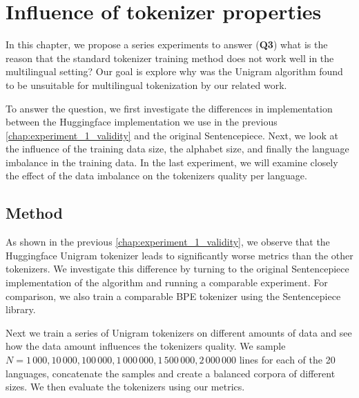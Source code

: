 \chapter{Influence of tokenizer properties}
\label{chap:experiment_2_properties}


In this chapter, we propose a series experiments to answer (\textbf{Q3}) what is the reason that the standard tokenizer training method does not work well in the multilingual setting? Our goal is explore why was the Unigram algorithm found to be unsuitable for multilingual tokenization by our related work.

To answer the question, we first investigate the differences in implementation between the Huggingface implementation we use in the previous \autoref{chap:experiment_1_validity} and the original Sentencepiece. Next, we look at the influence of the training data size, the alphabet size, and finally the language imbalance in the training data. In the last experiment, we will examine closely the effect of the data imbalance on the tokenizers quality per language.

\section{Method}

As shown in the previous \autoref{chap:experiment_1_validity}, we observe that the Huggingface Unigram tokenizer leads to significantly worse metrics than the other tokenizers. We investigate this difference by turning to the original Sentencepiece implementation of the algorithm and running a comparable experiment. For comparison, we also train a comparable BPE tokenizer using the Sentencepiece library. 


Next we train a series of Unigram tokenizers on different amounts of data and see how the data amount influences the tokenizers quality. We sample $N = 1\,000, 10\,000, 100\,000, 1\,000\,000, 1\,500\,000, 2\,000\,000$ lines for each of the 20 languages, concatenate the samples and create a balanced corpora of different sizes. We then evaluate the tokenizers using our metrics.

